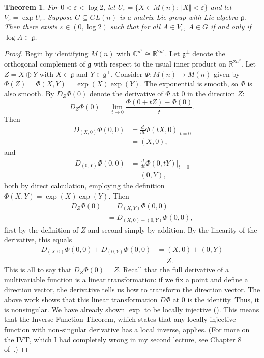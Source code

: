 \documentclass[12pt]{article}
\newcommand{\C}{\mathbb{C}}
\newcommand{\R}{\mathbb{R}}
\newcommand{\g}{\mathfrak{g}}
\newcommand{\V}{\Vert}
\newtheorem{them}{Theorem}[section]
\theoremstyle{definition}
\theoremstyle{definition}
\theoremstyle{definition}
\theoremstyle{definition}
\theoremstyle{definition}
\theoremstyle{definition}
\theoremstyle{definition}
\theoremstyle{definition}
\begin{document}
\begin{them}\label{them:3.42}
For $0 < \varepsilon < \log 2$, let $U_\varepsilon =
\{X \in M(n): \V X \V < \varepsilon\}$ and let
$V_\varepsilon = \exp U_\varepsilon$. Suppose $G
\subseteq GL(n)$ is a matrix Lie group with
Lie algebra $\g$. Then there exists $\varepsilon \in
(0, \log 2)$ such that for all $A \in
V_\varepsilon$, $A \in G$ if and only if $\log A
\in \g$.
\end{them}
\begin{proof}
\par{Begin by identifying $M(n)$ with $\C^{n^2}
\cong \R^{2n^2}$. Let $\g^\bot$ denote the
orthogonal complement of $\g$ with respect to the
usual inner product on $\R^{2n^2}$. Let $Z = X
\oplus Y$ with $X \in \g$ and $Y \in \g^\bot$.
Consider $\Phi: M(n) \to M(n)$ given by $\Phi(Z) =
\Phi(X,Y) = \exp(X) \exp(Y)$. The exponential is
smooth, so $\Phi$ is also smooth. By $D_Z\Phi(0)$
denote the derivative of $\Phi$ at $0$ in the
direction $Z$: 
\[
D_Z\Phi(0) = \lim_{t \to 0}\frac{\Phi(0 + tZ) - \Phi(0)}{t}.
\]
Then
\[
\begin{aligned}
    D_{(X,0)}\Phi(0,0) & = \frac{d}{dt}\Phi(tX,0)\Big|_{t=0} \\
    & = (X,0),
\end{aligned}
\] 
and 
\[
\begin{aligned}
    D_{(0,Y)}\Phi(0,0) & = \frac{d}{dt}\Phi(0,tY)\Big|_{t=0} \\
    & = (0,Y),
\end{aligned}
\] both by direct calculation, employing the definition $\Phi(X,Y) = \exp(X)\exp(Y)$. Then 
\[
\begin{aligned}
    D_Z\Phi(0) & = D_{(X,Y)}\Phi(0,0) \\
    & =  D_{(X,0) + (0,Y)}\Phi(0,0), 
\end{aligned}
\] 
first by the definition of $Z$ and second simply
by addition. By the linearity of the derivative,
this equals
\[
\begin{aligned}
    D_{(X,0)}\Phi(0,0) + D_{(0,Y)}\Phi(0,0) & = (X,0) + (0,Y) \\ 
    & = Z.
\end{aligned}
\] 
This is all to say that
$D_Z\Phi(0) = Z$. Recall that the full derivative
of a multivariable function is a linear
transformation: if we fix a point and define a
direction vector, the derivative tells us how to
transform the direction vector. The above work
shows that this linear transformation $D\Phi$ at
$0$ is the identity. Thus, it is nonsingular. We
have already shown $\exp$ to be locally injective ().
This means that the Inverse Function Theorem,
which states that any locally injective function
with non-singular derivative has a local inverse,
applies. (For more on the IVT, which I had
completely wrong in my second lecture, see Chapter
8 of~\cite{Munkres}.)} 


\end{proof}
\end{document}
